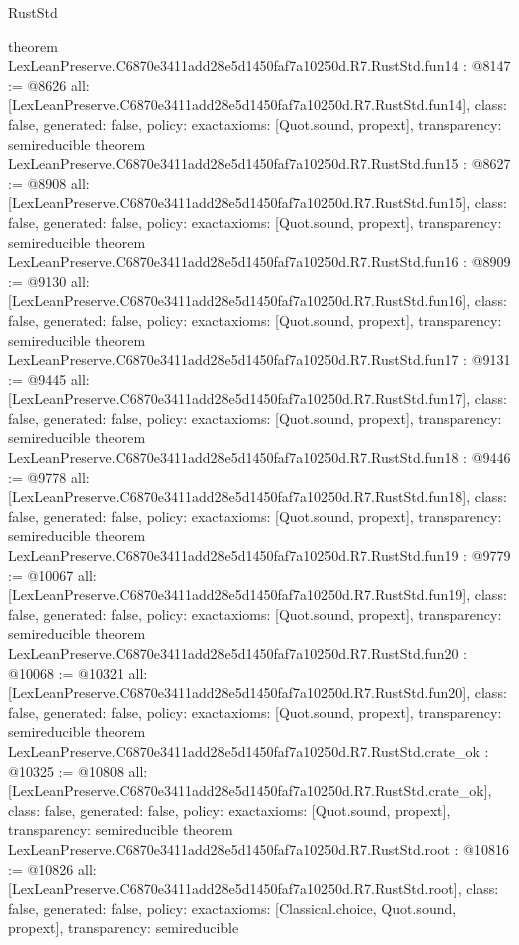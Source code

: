 \begin{lexlean}{RustStd}
\begin{coremodule}
{}
theorem LexLeanPreserve.C6870e3411add28e5d1450faf7a10250d.R7.RustStd.fun14 : @8147 := @8626 {
  all: [LexLeanPreserve.C6870e3411add28e5d1450faf7a10250d.R7.RustStd.fun14],
  class: false,
  generated: false,
  policy: exact{axioms: [Quot.sound, propext]},
  transparency: semireducible
}
theorem LexLeanPreserve.C6870e3411add28e5d1450faf7a10250d.R7.RustStd.fun15 : @8627 := @8908 {
  all: [LexLeanPreserve.C6870e3411add28e5d1450faf7a10250d.R7.RustStd.fun15],
  class: false,
  generated: false,
  policy: exact{axioms: [Quot.sound, propext]},
  transparency: semireducible
}
theorem LexLeanPreserve.C6870e3411add28e5d1450faf7a10250d.R7.RustStd.fun16 : @8909 := @9130 {
  all: [LexLeanPreserve.C6870e3411add28e5d1450faf7a10250d.R7.RustStd.fun16],
  class: false,
  generated: false,
  policy: exact{axioms: [Quot.sound, propext]},
  transparency: semireducible
}
theorem LexLeanPreserve.C6870e3411add28e5d1450faf7a10250d.R7.RustStd.fun17 : @9131 := @9445 {
  all: [LexLeanPreserve.C6870e3411add28e5d1450faf7a10250d.R7.RustStd.fun17],
  class: false,
  generated: false,
  policy: exact{axioms: [Quot.sound, propext]},
  transparency: semireducible
}
theorem LexLeanPreserve.C6870e3411add28e5d1450faf7a10250d.R7.RustStd.fun18 : @9446 := @9778 {
  all: [LexLeanPreserve.C6870e3411add28e5d1450faf7a10250d.R7.RustStd.fun18],
  class: false,
  generated: false,
  policy: exact{axioms: [Quot.sound, propext]},
  transparency: semireducible
}
theorem LexLeanPreserve.C6870e3411add28e5d1450faf7a10250d.R7.RustStd.fun19 : @9779 := @10067 {
  all: [LexLeanPreserve.C6870e3411add28e5d1450faf7a10250d.R7.RustStd.fun19],
  class: false,
  generated: false,
  policy: exact{axioms: [Quot.sound, propext]},
  transparency: semireducible
}
theorem LexLeanPreserve.C6870e3411add28e5d1450faf7a10250d.R7.RustStd.fun20 : @10068 := @10321 {
  all: [LexLeanPreserve.C6870e3411add28e5d1450faf7a10250d.R7.RustStd.fun20],
  class: false,
  generated: false,
  policy: exact{axioms: [Quot.sound, propext]},
  transparency: semireducible
}
theorem LexLeanPreserve.C6870e3411add28e5d1450faf7a10250d.R7.RustStd.crate_ok : @10325 := @10808 {
  all: [LexLeanPreserve.C6870e3411add28e5d1450faf7a10250d.R7.RustStd.crate_ok],
  class: false,
  generated: false,
  policy: exact{axioms: [Quot.sound, propext]},
  transparency: semireducible
}
theorem LexLeanPreserve.C6870e3411add28e5d1450faf7a10250d.R7.RustStd.root : @10816 := @10826 {
  all: [LexLeanPreserve.C6870e3411add28e5d1450faf7a10250d.R7.RustStd.root],
  class: false,
  generated: false,
  policy: exact{axioms: [Classical.choice, Quot.sound, propext]},
  transparency: semireducible
}


\end{coremodule}
\end{lexlean}
